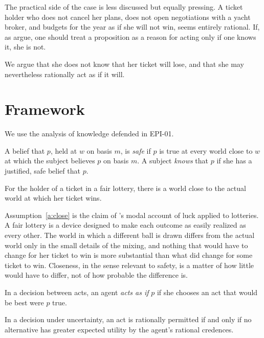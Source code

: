 \documentclass{situationist-preprint}
\begin{document}
The practical side of the case is less discussed but equally pressing. A ticket holder who does not cancel her plans, does not open negotiations with a yacht broker, and budgets for the year as if she will not win, seems entirely rational. If, as \citet{HawthorneStanley2008} argue, one should treat a proposition as a reason for acting only if one knows it, she is not.

We argue that she does not know that her ticket will lose, and that she may nevertheless rationally act as if it will.

\section{Framework}

We use the analysis of knowledge defended in EPI-01.

\begin{definition}\label{d:safe}
A belief that $p$, held at $w$ on basis $m$, is \emph{safe} if $p$ is true at every world close to $w$ at which the subject believes $p$ on basis $m$. A subject \emph{knows} that $p$ if she has a justified, safe belief that $p$.
\end{definition}

\begin{assumption}\label{a:close}
For the holder of a ticket in a fair lottery, there is a world close to the actual world at which her ticket wins.
\end{assumption}

Assumption~\ref{a:close} is the claim of \citet{Pritchard2005}'s modal account of luck applied to lotteries. A fair lottery is a device designed to make each outcome as easily realized as every other. The world in which a different ball is drawn differs from the actual world only in the small details of the mixing, and nothing that would have to change for her ticket to win is more substantial than what did change for some ticket to win. Closeness, in the sense relevant to safety, is a matter of how little would have to differ, not of how probable the difference is.

\begin{definition}[Acting as if]\label{d:asif}
In a decision between acts, an agent \emph{acts as if} $p$ if she chooses an act that would be best were $p$ true.
\end{definition}

\begin{principle}\label{p:eu}
In a decision under uncertainty, an act is rationally permitted if and only if no alternative has greater expected utility by the agent's rational credences.
\end{principle}
\end{document}
